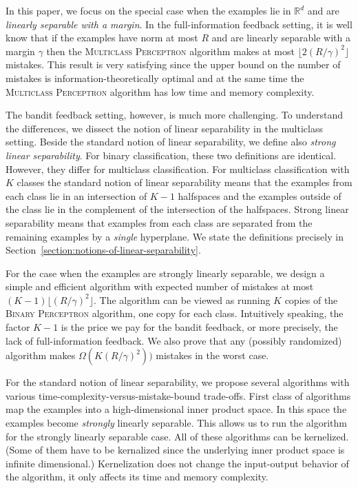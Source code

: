 \documentclass[12pt]{article}
\newcommand{\R}{\mathbb{R}}  %
\begin{document}
In this paper, we focus on the special case when the examples lie in $\R^d$ and
are \emph{linearly separable with a margin}. In the full-information feedback
setting, it is well know that if the examples have norm at most $R$ and are
linearly separable with a margin $\gamma$ then the \textsc{Multiclass
Perceptron} algorithm makes at most $\lfloor 2(R/\gamma)^2 \rfloor$ mistakes.
This result is very satisfying since the upper bound on the number of mistakes
is information-theoretically optimal and at the same time the \textsc{Multiclass
Perceptron} algorithm has low time and memory complexity.

The bandit feedback setting, however, is much more challenging. To understand
the differences, we dissect the notion of linear separability in the multiclass
setting. Beside the standard notion of linear separability, we define also
\emph{strong linear separability}. For binary classification, these two
definitions are identical. However, they differ for multiclass classification.
For multiclass classification with $K$ classes the standard notion of linear
separability means that the examples from each class lie in an intersection of
$K-1$ halfspaces and the examples outside of the class lie in the complement of
the intersection of the halfspaces. Strong linear separability means that
examples from each class are separated from the remaining examples by a
\emph{single} hyperplane. We state the definitions precisely in
Section~\ref{section:notions-of-linear-separability}.

For the case when the examples are strongly linearly separable, we design a
simple and efficient algorithm with expected number of mistakes at most $(K-1)
\lfloor (R/\gamma)^2 \rfloor$. The algorithm can be viewed as running $K$ copies
of the \textsc{Binary Perceptron} algorithm, one copy for each class.
Intuitively speaking, the factor $K-1$ is the price we pay for the bandit
feedback, or more precisely, the lack of full-information feedback. We also
prove that any (possibly randomized) algorithm makes $\Omega(K (R/\gamma)^2))$
mistakes in the worst case.

For the standard notion of linear separability, we propose several algorithms
with various time-complexity-versus-mistake-bound trade-offs. First class of
algorithms map the examples into a high-dimensional inner product space. In this
space the examples become \emph{strongly} linearly separable. This allows us to
run the algorithm for the strongly linearly separable case. All of these
algorithms can be kernelized. (Some of them have to be kernalized since the
underlying inner product space is infinite dimensional.) Kernelization does not
change the input-output behavior of the algorithm, it only affects its time
and memory complexity.
\end{document}
